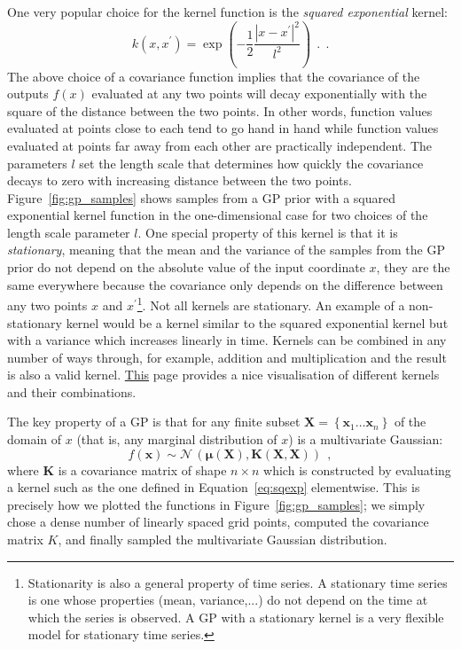 \documentclass[12pt,dvipsnames]{report}
\renewcommand{\vec}[1]{\boldsymbol{\mathbf{#1}}}
\newcommand{\hquad}{~~}
\begin{document}
One very popular choice for the kernel function is the \emph{squared
    exponential} kernel:
\begin{equation}
    k(x, x^\prime) = \exp\left(-\frac{1}{2}\frac{\left|x-x^\prime\right|^2}{l^2}\right)\hquad .
    \hquad.
    \label{eq:sqexp}
\end{equation}
The above choice of a covariance function implies that the covariance of the outputs
$f(x)$ evaluated at any two points  will decay exponentially with the square of
the distance between the two points.
In other words, function values evaluated at points close to each tend to go hand in hand
while function values evaluated at points far away from each other are practically
independent.
The parameters $l$ set the length scale that determines how quickly the covariance decays
to zero with increasing distance between the two points.
Figure~\ref{fig:gp_samples} shows samples from a GP prior with a squared exponential
kernel function in the one-dimensional case for two choices of the length scale parameter
$l$. One special property of this kernel is that it is \emph{stationary}, meaning
that the mean and the variance of the samples from the GP prior do not depend on the
absolute value of the input coordinate $x$, they are the same everywhere because
the covariance only depends on the difference between any two points $x$ and
$x^\prime$\footnote{Stationarity is also a general property of time series.
    A stationary  time series is one whose properties (mean, variance,...) do not depend
    on the time at which the series is observed. A GP with a stationary kernel is a very flexible
    model for stationary time series.}. Not all kernels are stationary. An example of
a non-stationary kernel would be a kernel similar to the squared exponential kernel but with
a variance which increases linearly in time.
Kernels can be combined in any number of ways through, for example, addition and
multiplication and the result is also a valid kernel.
\href{https://www.cs.toronto.edu/~duvenaud/cookbook/}{This} page provides a
nice visualisation of different kernels and their combinations.

The key property of a GP is that for any finite subset
$\vec{X}=\left\{\mathbf{x}_{1} \ldots \mathbf{x}_{n}\right\}$ of the domain of
$x$ (that is, any marginal distribution of $x$) is a multivariate Gaussian:
\begin{equation}
    f(\vec{x})\sim \mathcal{N}\,(\vec{\mu}(\vec{X}), \vec K(\vec{X}, \vec{X}))
    \hquad,
\end{equation}
where $\vec K$ is a covariance matrix of shape $n\times n$ which is constructed by
evaluating  a kernel such as the one defined in Equation~\ref{eq:sqexp} elementwise.
This is precisely how we plotted
the functions in Figure~\ref{fig:gp_samples}; we simply chose a dense number of linearly
spaced grid points, computed the covariance matrix $K$, and finally sampled the multivariate
Gaussian distribution.
\end{document}
